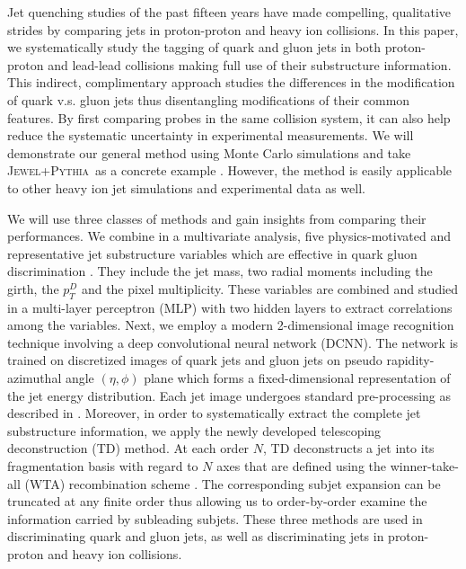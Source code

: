 \documentclass[notoc]{JHEP3}
\newcommand{\jwpy}{\textsc{Jewel+Pythia}~}
\begin{document}
Jet quenching studies of the past fifteen years have made compelling, qualitative strides by comparing jets in proton-proton and heavy ion collisions. In this paper, we systematically study the tagging of quark and gluon jets in both proton-proton and lead-lead collisions making full use of their substructure information. This indirect, complimentary approach studies the  differences in the modification of quark v.s. gluon jets thus disentangling modifications of their common features. By first comparing probes in the same collision system, it can also help reduce the systematic uncertainty in experimental measurements. We will demonstrate our general method using Monte Carlo simulations and take \jwpy as a concrete example \cite{Zapp:2013zya,KunnawalkamElayavalli:2016ttl}. However, the method is easily applicable to other heavy ion jet simulations \cite{Armesto:2009fj,Casalderrey-Solana:2016jvj,Cao:2017zih} and experimental data as well.

We will use three classes of methods and gain insights from comparing their performances. We combine in a multivariate analysis, five physics-motivated and representative jet substructure variables which are effective in quark gluon discrimination \cite{Gallicchio:2012ez}. They include the jet mass, two radial moments including the girth, the $p_T^D$ and the pixel multiplicity. These variables are combined and studied in a multi-layer perceptron (MLP) with two hidden layers to extract correlations among the variables. Next, we employ a modern 2-dimensional image recognition technique involving a deep convolutional neural network (DCNN). The network is trained on discretized images of quark jets and gluon jets on pseudo rapidity-azimuthal angle $(\eta,\phi)$ plane which forms a fixed-dimensional representation of the jet energy distribution. Each jet image undergoes standard pre-processing as described in \cite{deOliveira:2015xxd}. Moreover, in order to systematically extract the complete jet substructure information, we apply the newly developed telescoping deconstruction (TD) method. At each order $N$, TD deconstructs a jet into its fragmentation basis with regard to $N$ axes that are defined using the winner-take-all (WTA) recombination scheme \cite{Bertolini:2013iqa}. The corresponding subjet expansion can be truncated at any finite order thus allowing us to order-by-order examine the information carried by subleading subjets. These three methods are used in discriminating quark and gluon jets, as well as discriminating jets in proton-proton and heavy ion collisions.
\end{document}
